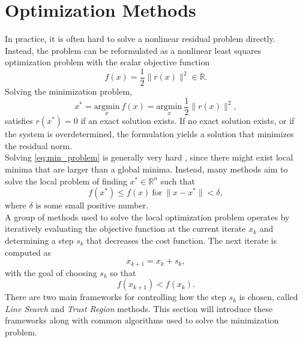 \section{Optimization Methods}
\label{sec:theory_optmet}

In practice, it is often hard to solve a nonlinear residual problem directly. Instead, the problem can be reformulated as a nonlinear least squares optimization problem with the scalar objective function
\begin{equation}
f(x) = \frac{1}{2} \| r(x) \|^2 \in \mathbb{R}.
\label{eq:least_squares_objective}
\end{equation}
Solving the minimization problem,
\begin{equation}
\label{eq:min_problem}
    x^\ast = \underset{x}{\text{argmin}} \ f(x) = \underset{x}{\text{argmin}} \ \frac{1}{2} \| r(x) \|^2,
\end{equation}
satisfies $r(x^*) = 0$ if an exact solution exists. If no exact solution exists, or if the system is overdetermined, the formulation yields a solution that minimizes the residual norm.\\

Solving \cref{eq:min_problem} is generally very hard \cite{madsen2004}, since there might exist local minima that are larger than a global minima. Instead, many methods aim to solve the local problem of finding $x^\ast \in \mathbb{R}^n$ such that
\begin{equation*}
    f(x^*) \leq f(x) \ \text{for} \ \|x-x^*\|<\delta,
\end{equation*}
where $\delta$ is some small positive number.\\

A group of methods used to solve the local optimization problem operates by iteratively evaluating the objective function at the current iterate $x_k$ and determining a step $s_k$ that decreases the cost function. The next iterate is computed as
\begin{equation}
\label{eq:step_update_rule}
    x_{k+1} = x_k + s_k,
\end{equation}
with the goal of choosing $s_k$ so that
\begin{equation*}
    f(x_{k+1}) < f(x_k).
\end{equation*}
There are two main frameworks for controlling how the step $s_k$ is chosen, called \textit{Line Search} and \textit{Trust Region} methods. This section will introduce these frameworks along with common algorithms used to solve the minimization problem.

